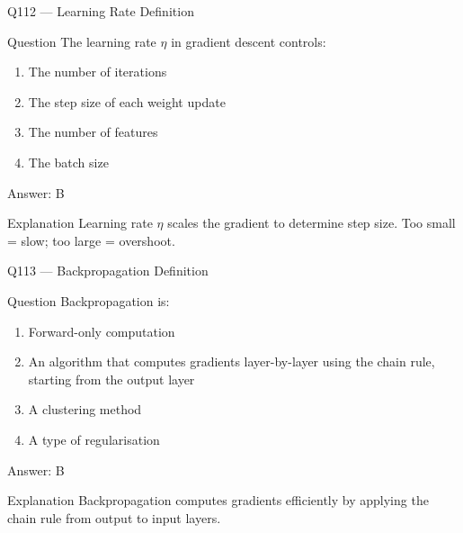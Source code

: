 \documentclass[aspectratio=169,8pt]{beamer}
\begin{document}
	\begin{frame}{Q112 --- Learning Rate Definition}
		\begin{block}{Question}
			The learning rate $\eta$ in gradient descent controls:
			\begin{enumerate}
				\item The number of iterations
				\item The step size of each weight update
				\item The number of features
				\item The batch size
			\end{enumerate}
		\end{block}
		\begin{exampleblock}{Answer: B}\end{exampleblock}
		\begin{block}{Explanation}
			Learning rate $\eta$ scales the gradient to determine step size. Too small = slow; too large = overshoot.
		\end{block}
	\end{frame}
	
	\begin{frame}{Q113 --- Backpropagation Definition}
		\begin{block}{Question}
			Backpropagation is:
			\begin{enumerate}
				\item Forward-only computation
				\item An algorithm that computes gradients layer-by-layer using the chain rule, starting from the output layer
				\item A clustering method
				\item A type of regularisation
			\end{enumerate}
		\end{block}
		\begin{exampleblock}{Answer: B}\end{exampleblock}
		\begin{block}{Explanation}
			Backpropagation computes gradients efficiently by applying the chain rule from output to input layers.
		\end{block}
	\end{frame}
	
\end{document}
